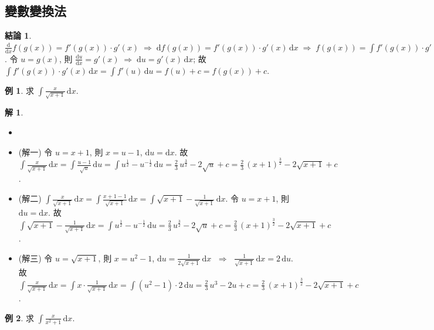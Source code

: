 \documentclass[12pt]{extarticle}
\newcommand{\ds}{\displaystyle}
\newcommand{\ie}{\;\Longrightarrow\;}
\theoremstyle{definition}
\newtheorem*{fact}{結論}
\newtheorem*{ex}{例}
\newtheorem*{sol}{解}
\newcommand{\myline}{\noindent\makebox[\linewidth]{\rule{\paperwidth}{0.4pt}}}
\begin{document}
\myline

\subsection*{變數變換法}

\begin{fact}
  $\ds\frac{\text{d}}{\text{d}x}f(g(x)) = f'(g(x))\cdot g'(x) \ie \text{d}f(g(x)) = f'(g(x))\cdot g'(x)\,\text{d}x \ie f(g(x)) = \int\!f'(g(x))\cdot g'(x)\,\text{d}x$. 令 $\ds u = g(x)$, 則 $\ds\frac{\text{d}u}{\text{d}x} = g'(x)\ie \text{d} u = g'(x)\,\text{d}x$; 故 $\ds\int\!f'(g(x))\cdot g'(x)\,\text{d}x = \int\!f'(u)\,\text{d}u = f(u) + c = f(g(x)) + c$.  
\end{fact}

\begin{ex}
  求 $\ds\int\!\frac{x}{\sqrt{x + 1}}\,\text{d}x$. 
\end{ex}

\begin{sol}
  \begin{itemize}
    \item[]
    \item (解一) 令 $\ds u = x + 1$, 則 $\ds x = u - 1$, $\ds\text{d}u = \text{d}x$. 故 $\ds\int\!\frac{x}{\sqrt{x + 1}}\,\text{d}x = \int\!\frac{u - 1}{\sqrt{u}}\,\text{d}u = \int\!u^{\frac{1}{2}} - u^{-\frac{1}{2}}\,\text{d}u = \frac{2}{3}\,u^{\frac{3}{2}} - 2\sqrt{u} + c = \frac{2}{3}\,(x + 1)^{\frac{3}{2}} - 2\sqrt{x + 1} + c$. 
    \item (解二) $\ds\int\!\frac{x}{\sqrt{x + 1}}\,\text{d}x = \int\!\frac{x + 1 - 1}{\sqrt{x + 1}}\,\text{d}x = \int\!\sqrt{x + 1} - \frac{1}{\sqrt{x + 1}}\,\text{d}x$. 令 $\ds u = x + 1$, 則 $\ds\text{d}u = \text{d}x$. 故 $\ds\int\!\sqrt{x + 1} - \frac{1}{\sqrt{x + 1}}\,\text{d}x = \int\!u^{\frac{1}{2}} - u^{-\frac{1}{2}}\,\text{d}u = \frac{2}{3}\,u^{\frac{3}{2}} - 2\sqrt{u} + c = \frac{2}{3}\,(x + 1)^{\frac{3}{2}} - 2\sqrt{x + 1} + c$. 
    \item (解三) 令 $\ds u = \sqrt{x + 1}$, 則 $\ds x = u^2 - 1$, $\ds\text{d}u = \frac{1}{2\sqrt{x + 1}}\,\text{d}x$ $\ie$ $\ds\frac{1}{\sqrt{x + 1}}\,\text{d}x = 2\,\text{d}u$. 故 $\ds\int\!\frac{x}{\sqrt{x + 1}}\,\text{d}x = \int\!x\cdot\frac{1}{\sqrt{x + 1}}\,\text{d}x = \int\!(u^2 - 1)\cdot2\,\text{d}u = \frac{2}{3}\,u^3 - 2u + c = \frac{2}{3}\,(x + 1)^{\frac{3}{2}} - 2\sqrt{x + 1} + c$. 
  \end{itemize}
\end{sol}

\begin{ex}
  求 $\ds\int\!\frac{x}{x^2+1}\,\text{d}x$. 
\end{ex}
\end{document}

